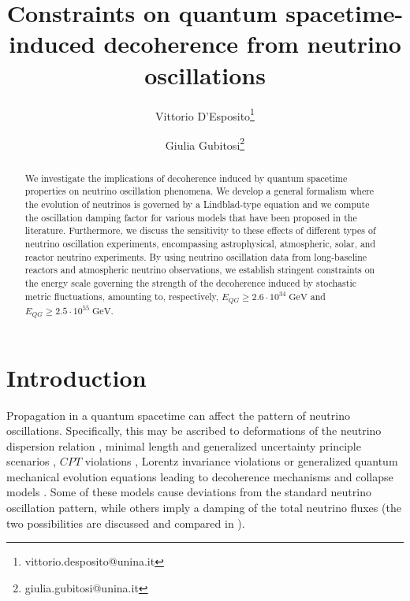 \documentclass[11pt]{article}
\begin{document}
\title{{\bf Constraints on quantum spacetime-induced  decoherence from neutrino oscillations}}
\date{}
\author[]{
Vittorio D'Esposito\thanks{vittorio.desposito@unina.it} \and Giulia Gubitosi\thanks{giulia.gubitosi@unina.it}}



\maketitle

\begin{abstract}
We investigate the implications of decoherence induced by quantum spacetime properties on neutrino oscillation phenomena.
We develop a general formalism where the evolution of neutrinos is governed by a Lindblad-type equation and we compute the oscillation damping factor for various models that have been proposed in the literature. 
Furthermore, we discuss the sensitivity to these effects of different types of neutrino oscillation experiments, encompassing astrophysical, atmospheric, solar, and reactor neutrino experiments. By using neutrino oscillation data from long-baseline reactors and atmospheric neutrino observations, we establish stringent constraints on the energy scale governing the strength of the decoherence induced by stochastic metric fluctuations, amounting to, respectively, $E_{QG}\geq 2.6 \cdot 10^{34}\; \text{GeV}$ and $E_{QG}\geq 2.5\cdot 10^{55}\;\text{GeV}$.

\end{abstract}

\section{Introduction}

Propagation in a quantum spacetime can affect the pattern of neutrino oscillations. Specifically, this may be ascribed to deformations of the neutrino dispersion relation \cite{Christian:2004xb}, minimal length and generalized uncertainty principle scenarios \cite{Sprenger:2011jc, Banerjee:2022slh}, $CPT$ violations \cite{Mavromatos:2007hv, Mavromatos:2004sz, Barenboim:2004wu}, Lorentz invariance violations \cite{IceCube:2017qyp,IceCube:2021tdn} or generalized quantum mechanical evolution equations leading to decoherence mechanisms and collapse models \cite{Christian:2005qa, ELLIS199237, Ellis:1997jw}. Some of these models cause deviations from the standard neutrino oscillation pattern, while others \cite{Mavromatos:2007hv, IceCube:2017qyp, IceCube:2021tdn} imply a damping of the total neutrino fluxes (the two possibilities are discussed and compared in \cite{Blennow:2005yk}). 
\end{document}
